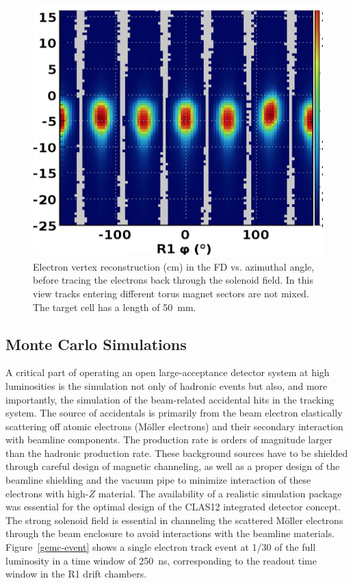 \documentclass[final,3p,twocolumn]{elsarticle}
\begin{document}
\begin{figure} 
\includegraphics[width=0.9\columnwidth]{R1-vertex.png}
\caption{Electron vertex reconstruction (cm) in the FD vs. azimuthal angle, before tracing the electrons back
  through the solenoid field. In this view tracks entering different torus magnet sectors are not mixed. The target
  cell has a length of 50~mm.} 
\label{vertex}
\end{figure}

\subsection{Monte Carlo Simulations} 

A critical part of operating an open large-acceptance detector system at high luminosities is the simulation not
only of hadronic events but also, and more importantly, the simulation of the beam-related accidental hits in the
tracking system. The source of accidentals is primarily from the beam electron elastically scattering off atomic
electrons (M{\"o}ller electrons) and their secondary interaction with beamline components. The production rate
is orders of magnitude larger than the hadronic production rate. These background sources have to be shielded
through careful design of magnetic channeling, as well as a proper design of the beamline shielding and the vacuum
pipe to minimize interaction of these electrons with high-$Z$ material. The availability of a realistic simulation
package was essential for the optimal design of the CLAS12 integrated detector concept. The strong solenoid
field is essential in channeling the scattered M{\"o}ller electrons through the beam enclosure to avoid interactions
with the beamline materials. Figure~\ref{gemc-event} shows a single electron track event at 1/30 of the full
luminosity in a time window of 250~ns, corresponding to the readout time window in the R1 drift chambers. 
 
\end{document}
